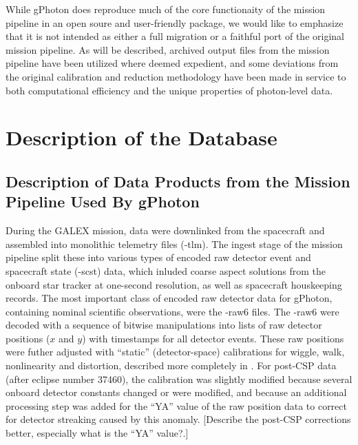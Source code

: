 \documentclass[5p]{elsarticle}
\begin{document}
While gPhoton does reproduce much of the core functionaity of the mission pipeline in an open soure and user-friendly package, we would like to emphasize that it is not intended as either a full migration or a faithful port of the original mission pipeline. As will be described, archived output files from the mission pipeline have been utilized where deemed expedient, and some deviations from the original calibration and reduction methodology have been made in service to both computational efficiency and the unique properties of photon-level data.

\section{Description of the Database}
\label{database}
\subsection{Description of Data Products from the Mission Pipeline Used By gPhoton}
During the GALEX mission, data were downlinked from the spacecraft and assembled into monolithic telemetry files (-tlm). The ingest stage of the mission pipeline split these into various types of encoded raw detector event and spacecraft state (-scst) data, which inluded coarse aspect solutions from the onboard star tracker at one-second resolution, as well as spacecraft houskeeping records. The most important class of encoded raw detector data for gPhoton, containing nominal scientific observations, were the -raw6 files. The -raw6 were decoded with a sequence of bitwise manipulations into lists of raw detector positions ($x$ and $y$) with timestamps for all detector events. These raw positions were futher adjusted with ``static'' (detector-space) calibrations for wiggle, walk, nonlinearity and distortion, described more completely in \citet{mor2007}. For post-CSP data (after eclipse number 37460), the calibration was slightly modified because several onboard detector constants changed or were modified, and because an additional processing step was added for the “YA” value of the raw position data to correct for detector streaking caused by this anomaly. {\color{red}[Describe the post-CSP corrections better, especially what is the ``YA'' value?.]}
\end{document}
